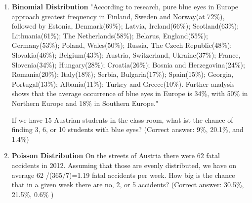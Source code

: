 \begin{enumerate}
    \item \textbf{Binomial Distribution} "According to research, pure blue eyes in Europe approach greatest frequency in Finland, Sweden and Norway(at 72\%), followed by Estonia, Denmark(69\%); Latvia, Ireland(66\%); Scotland(63\%); Lithuania(61\%); The Netherlands(58\%); Belarus, England(55\%); Germany(53\%); Poland, Wales(50\%); Russia, The Czech Republic(48\%); Slovakia(46\%); Belgium(43\%); Austria, Switzerland, Ukraine(37\%); France, Slovenia(34\%); Hungary(28\%); Croatia(26\%); Bosnia and Herzegovina(24\%); Romania(20\%); Italy(18\%); Serbia, Bulgaria(17\%); Spain(15\%); Georgia, Portugal(13\%); Albania(11\%); Turkey and Greece(10\%). Further analysis shows that the average occurrence of blue eyes in Europe is 34\%, with 50\% in Northern Europe and 18\% in Southern Europe."

    If we have 15 Austrian students in the class-room, what ist the chance of finding 3, 6, or 10 students with blue eyes?
    (Correct answer: 9\%, 20.1\%, and 1.4\%)

    \item \textbf{Poisson Distribution} On the streets of Austria there were 62 fatal accidents in 2012. Assuming that those are evenly distributed, we have on average
    62 /(365/7)=1.19 fatal accidents per week. How big is the chance that in a given week there are no, 2, or 5 accidents?
    (Correct answer: 30.5\%, 21.5\%, 0.6\% )
\end{enumerate}
